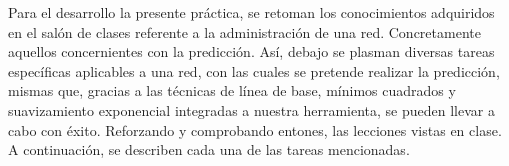 \noindent
Para el desarrollo la presente práctica, se retoman los conocimientos adquiridos en el salón de clases referente a la administración de una red. Concretamente aquellos concernientes con la predicción. 
\newline
Así, debajo se plasman diversas tareas específicas aplicables a una red, con las cuales se pretende realizar la predicción, mismas que, gracias a las técnicas de línea de base, mínimos cuadrados y suavizamiento exponencial integradas a nuestra herramienta, se pueden llevar a cabo con éxito. Reforzando y comprobando entones, las lecciones vistas en clase.
\newline
A continuación, se describen cada una de las tareas mencionadas.